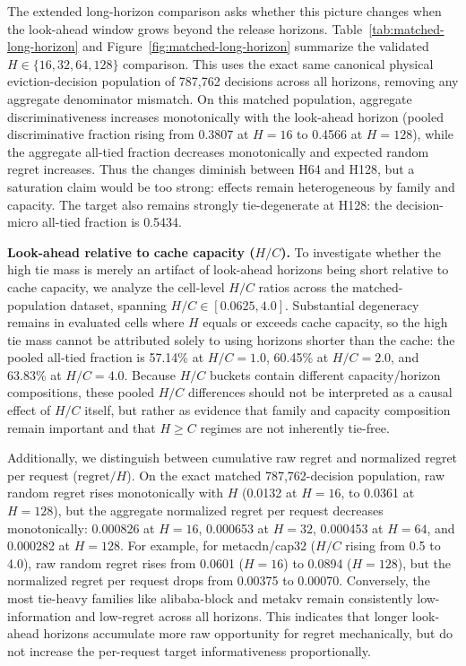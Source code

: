 The extended long-horizon comparison asks whether this picture changes
when the look-ahead window grows beyond the release horizons.
Table~\ref{tab:matched-long-horizon} and
Figure~\ref{fig:matched-long-horizon} summarize the validated
$H\in\{16,32,64,128\}$ comparison. This uses the exact same canonical
physical eviction-decision population of 787,762 decisions across all horizons,
removing any aggregate denominator mismatch. On this matched population,
aggregate discriminativeness increases monotonically with the look-ahead horizon
(pooled discriminative fraction rising from 0.3807 at $H=16$ to 0.4566 at $H=128$),
while the aggregate all-tied fraction decreases monotonically and expected random
regret increases. Thus the changes diminish between H64 and H128, but a
saturation claim would be too strong: effects remain heterogeneous by family
and capacity. The target also remains strongly tie-degenerate at H128:
the decision-micro all-tied fraction is 0.5434.

\textbf{Look-ahead relative to cache capacity ($H/C$).} To investigate
whether the high tie mass is merely an artifact of look-ahead horizons
being short relative to cache capacity, we analyze the cell-level $H/C$
ratios across the matched-population dataset, spanning $H/C \in [0.0625, 4.0]$.
Substantial degeneracy remains in evaluated cells where $H$ equals or exceeds
cache capacity, so the high tie mass cannot be attributed solely to using
horizons shorter than the cache: the pooled all-tied fraction is 57.14\% at
$H/C = 1.0$, 60.45\% at $H/C = 2.0$, and 63.83\% at $H/C = 4.0$. Because $H/C$
buckets contain different capacity/horizon compositions, these pooled $H/C$
differences should not be interpreted as a causal effect of $H/C$ itself, but
rather as evidence that family and capacity composition remain important and
that $H \ge C$ regimes are not inherently tie-free.

Additionally, we distinguish between cumulative raw regret and normalized
regret per request ($\text{regret}/H$). On the exact matched 787,762-decision
population, raw random regret rises monotonically with $H$ (0.0132 at $H=16$,
to 0.0361 at $H=128$), but the aggregate normalized regret per request decreases
monotonically: 0.000826 at $H=16$, 0.000653 at $H=32$, 0.000453 at $H=64$, and
0.000282 at $H=128$. For example, for metacdn/cap32 ($H/C$ rising from 0.5 to
4.0), raw random regret rises from 0.0601 ($H=16$) to 0.0894 ($H=128$), but the
normalized regret per request drops from 0.00375 to 0.00070. Conversely,
the most tie-heavy families like alibaba-block and metakv remain
consistently low-information and low-regret across all horizons. This
indicates that longer look-ahead horizons accumulate more raw opportunity
for regret mechanically, but do not increase the per-request target
informativeness proportionally.

